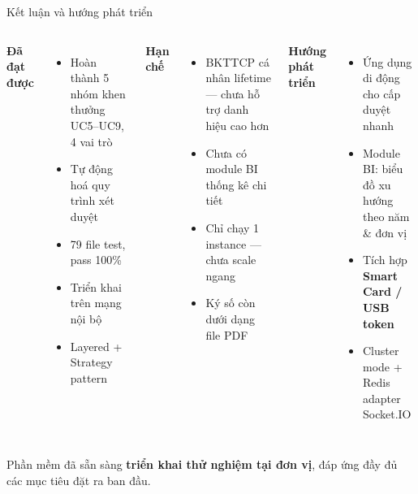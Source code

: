 \documentclass[aspectratio=43,xcolor=table]{beamer}
\newcommand{\highlight}[1]{\textcolor{hustred}{\textbf{#1}}}
\begin{document}
\begin{frame}{Kết luận và hướng phát triển}
  \begin{columns}[T,onlytextwidth]
    \textbf{\textcolor{hustred}{Đã đạt được}}
    \begin{itemize}\scriptsize
      \item Hoàn thành 5 nhóm khen thưởng UC5--UC9, 4 vai trò
      \item Tự động hoá quy trình xét duyệt
      \item 79 file test, pass 100\%
      \item Triển khai trên mạng nội bộ
      \item Layered + Strategy pattern
    \end{itemize}

    \textbf{\textcolor{hustred}{Hạn chế}}
    \begin{itemize}\scriptsize
      \item BKTTCP cá nhân lifetime --- chưa hỗ trợ danh hiệu cao hơn
      \item Chưa có module BI thống kê chi tiết
      \item Chỉ chạy 1 instance --- chưa scale ngang
      \item Ký số còn dưới dạng file PDF
    \end{itemize}

    \textbf{\textcolor{hustred}{Hướng phát triển}}
    \begin{itemize}\scriptsize
      \item Ứng dụng di động cho cấp duyệt nhanh
      \item Module BI: biểu đồ xu hướng theo năm \& đơn vị
      \item Tích hợp \textbf{Smart Card / USB token}
      \item Cluster mode + Redis adapter Socket.IO
    \end{itemize}
  \end{columns}

  \vspace{0.3cm}
  \begin{block}{}
    \centering\small Phần mềm đã sẵn sàng \highlight{triển khai thử nghiệm tại đơn vị}, đáp ứng đầy đủ các mục tiêu đặt ra ban đầu.
  \end{block}
\end{frame}
\end{document}

